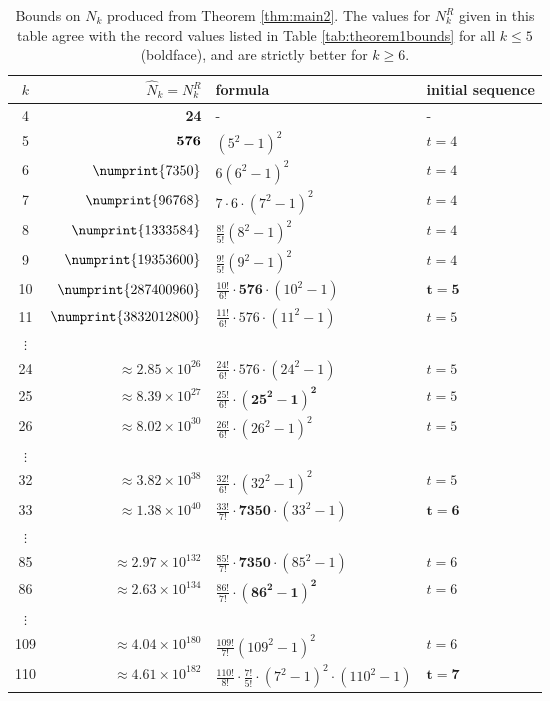 \documentclass[reqno,12pt]{amsart}
\theoremstyle{plain}
\theoremstyle{definition}
\theoremstyle{remark}
\begin{document}
\begin{table}[htp]
\caption{Bounds on $N_{k}$ produced from Theorem \ref{thm:main2}. The values for $N^{R}_{k}$ given in this table agree with
the record values listed in Table \ref{tab:theorem1bounds} for all $k \leq 5$ (boldface), and are strictly better for  $k \geq 6$.}
\begin{center}

\begin{tabular}{c | r | l | l}
$k$ & $\hat{N}_{k} = N^{R}_{k}$ & formula & initial sequence \\ \hline
4 & {\bf 24} & - & -\\
5 & ${\bf 576}$ & $(5^{2}-1)^{2}$& $t = 4$\\
6 & $\numprint{7350}$ & $6(6^{2}-1)^{2}$ & $t= 4$\\
7 & $\numprint{96768}$ & $7\cdot6 \cdot (7^{2}-1)^{2}$ & $t = 4$ \\
8 & $\numprint{1333584}$ & $\frac{8!}{5!} (8^{2}-1)^{2}$ & $t = 4$ \\
9 & $\numprint{19353600}$ & $\frac{9!}{5!} (9^{2}-1)^{2}$ & $t = 4$ \\
10 & $\numprint{287400960}$ & $\frac{10!}{6!}\cdot \mathbf{ 576 }\cdot (10^{2}-1)$ & $\mathbf{t = 5}$ \\ 
11 & $\numprint{3832012800}$ & $\frac{11!}{6!}\cdot 576 \cdot (11^{2}-1)$ & $t = 5$ \\
$\vdots$ & & &  \\
24 & $\approx 2.85 \times 10^{26}$ & $\frac{24!}{6!}\cdot 576 \cdot (24^{2}-1)$ &  $t = 5$\\
25 & $\approx 8.39 \times 10^{27}$ & $\frac{25!}{6!}\cdot \mathbf{(25^{2}-1)^{2}}$ &  $t = 5$\\
26 & $\approx 8.02 \times 10^{30}$ &  $\frac{26!}{6!}\cdot (26^{2}-1)^{2}$ & $t = 5$\\
$\vdots$ & & & \\
32 & $\approx 3.82 \times 10^{38}$ & $\frac{32!}{6!}\cdot (32^{2}-1)^{2}$ & $t = 5$ \\
33 & $\approx 1.38 \times 10^{40}$ & $\frac{33!}{7!}\cdot \mathbf{7350} \cdot (33^{2}-1)$ & $\mathbf{t = 6}$ \\
$\vdots$ &&\\
85 & $\approx 2.97 \times 10^{132}$ &$\frac{85!}{7!}\cdot \mathbf{7350} \cdot (85^{2}-1)$& $t = 6$\\
86 & $\approx 2.63 \times 10^{134}$ &$\frac{86!}{7!} \cdot\mathbf{(86^{2}-1)^{2}}$& $t = 6$\\
$\vdots$ &&& \\
109&  $\approx 4.04 \times 10^{180}$&
$\frac{109!}{7!} (109^{2}-1)^{2}$
 &$t = 6$\\
110 & $\approx 4.61 \times 10^{182}$ & $\frac{110!}{8!}\cdot \frac{7!}{5!}\cdot (7^{2}-1)^{2} \cdot (110^{2}-1)$ & $\mathbf{t = 7}$
\end{tabular}
\end{center}
\label{tab:thm2bounds-large}
\end{table}%
\end{document}
